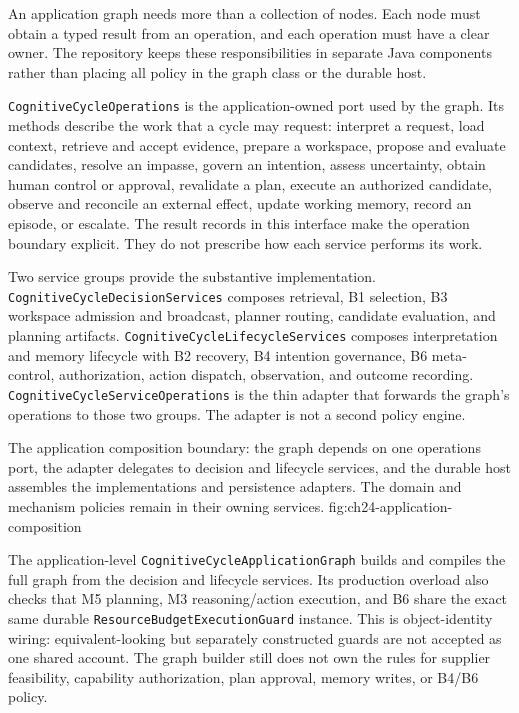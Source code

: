An application graph needs more than a collection of nodes. Each node must obtain a typed result from an operation, and each operation must have a clear owner. The repository keeps these responsibilities in separate Java components rather than placing all policy in the graph class or the durable host.

\texttt{CognitiveCycleOperations} is the application-owned port used by the graph. Its methods describe the work that a cycle may request: interpret a request, load context, retrieve and accept evidence, prepare a workspace, propose and evaluate candidates, resolve an impasse, govern an intention, assess uncertainty, obtain human control or approval, revalidate a plan, execute an authorized candidate, observe and reconcile an external effect, update working memory, record an episode, or escalate. The result records in this interface make the operation boundary explicit. They do not prescribe how each service performs its work.

Two service groups provide the substantive implementation. \texttt{CognitiveCycle\allowbreak DecisionServices} composes retrieval, B1 selection, B3 workspace admission and broadcast, planner routing, candidate evaluation, and planning artifacts. \texttt{CognitiveCycle\allowbreak LifecycleServices} composes interpretation and memory lifecycle with B2 recovery, B4 intention governance, B6 meta-control, authorization, action dispatch, observation, and outcome recording. \texttt{CognitiveCycleServiceOperations} is the thin adapter that forwards the graph's operations to those two groups. The adapter is not a second policy engine.

  {The application composition boundary: the graph depends on one operations port, the adapter delegates to decision and lifecycle services, and the durable host assembles the implementations and persistence adapters. The domain and mechanism policies remain in their owning services.}
  {fig:ch24-application-composition}

The application-level \texttt{CognitiveCycle\allowbreak{}ApplicationGraph} builds and compiles the full graph from the decision and lifecycle services. Its production overload also checks that M5 planning, M3 reasoning/action execution, and B6 share the exact same durable \texttt{ResourceBudgetExecutionGuard} instance. This is object-identity wiring: equivalent-looking but separately constructed guards are not accepted as one shared account. The graph builder still does not own the rules for supplier feasibility, capability authorization, plan approval, memory writes, or B4/B6 policy.

